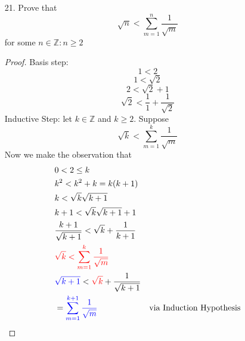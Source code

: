 \documentclass[12pt]{article}
\newcommand{\Z}{\mathbb{Z}}
\begin{document}
\begin{enumerate}
\begin{enumerate}
\begin{enumerate}[a.]
                        \item[21.] Prove that
                            \[
                            \sqrt{n} < \sum_{m=1}^{n} \frac{1}{\sqrt{m}}
                            \]
                            for some $n \in \Z : n \geq 2$
                            \begin{proof}
                                Basis step:
                                \[
                                1 < 2
                                \]
                                \[
                                1< \sqrt{2}
                                \]
                                \[
                                2 < \sqrt{2} + 1
                                \]
                                \[
                                \sqrt{2} < \frac{1}{1} + \frac{1}{\sqrt{2}}
                                \]
                                Inductive Step: let $k \in \Z$ and $k \geq 2$. Suppose 
                                \[
                                \sqrt{k} < \sum_{m=1}^{k}\frac{1}{\sqrt{m}}
                                \]
                                Now we make the observation that
                                \begin{align*}
                                    &0<2\leq k\\
                                    &k^2 < k^2+k = k(k+1)\\
                                    &k < \sqrt{k}\sqrt{k+1}\\
                                    &k+1 < \sqrt{k}\sqrt{k+1}+1\\
                                    &\frac{k+1}{\sqrt{k+1}} < \sqrt{k} + \frac{1}{k+1}\\
                                    & \textcolor{red}{\sqrt{k} < \sum_{m=1}^{k}\frac{1}{\sqrt{m}}}\\
                                    & \textcolor{blue}{\sqrt{k+1}} < \textcolor{red}{ \sqrt{k} } + \frac{1}{\sqrt{k+1}} \\
                                    &= \textcolor{blue}{\sum_{m=1}^{k+1}\frac{1}{\sqrt{m}}}
                                    & \text{via Induction Hypothesis}\\ 
                                \end{align*}

                            \end{proof}
                        
                \end{enumerate}


\end{enumerate}
\end{enumerate}
\end{document}

